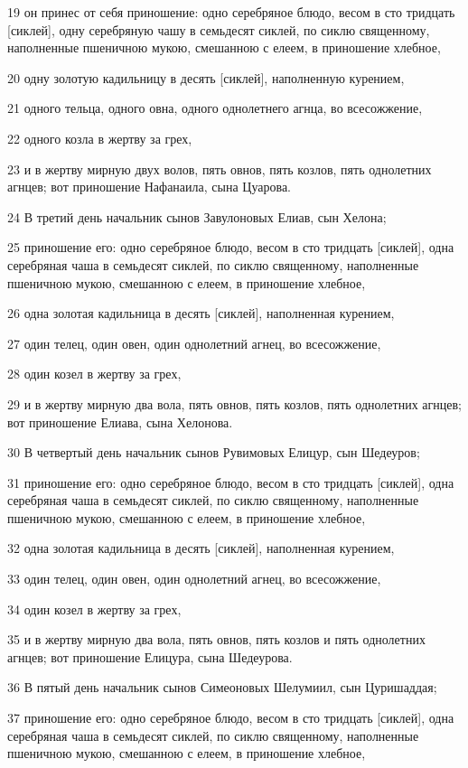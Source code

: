 \par 19 он принес от себя приношение: одно серебряное блюдо, весом в сто тридцать [сиклей], одну серебряную чашу в семьдесят сиклей, по сиклю священному, наполненные пшеничною мукою, смешанною с елеем, в приношение хлебное,
\par 20 одну золотую кадильницу в десять [сиклей], наполненную курением,
\par 21 одного тельца, одного овна, одного однолетнего агнца, во всесожжение,
\par 22 одного козла в жертву за грех,
\par 23 и в жертву мирную двух волов, пять овнов, пять козлов, пять однолетних агнцев; вот приношение Нафанаила, сына Цуарова.
\par 24 В третий день начальник сынов Завулоновых Елиав, сын Хелона;
\par 25 приношение его: одно серебряное блюдо, весом в сто тридцать [сиклей], одна серебряная чаша в семьдесят сиклей, по сиклю священному, наполненные пшеничною мукою, смешанною с елеем, в приношение хлебное,
\par 26 одна золотая кадильница в десять [сиклей], наполненная курением,
\par 27 один телец, один овен, один однолетний агнец, во всесожжение,
\par 28 один козел в жертву за грех,
\par 29 и в жертву мирную два вола, пять овнов, пять козлов, пять однолетних агнцев; вот приношение Елиава, сына Хелонова.
\par 30 В четвертый день начальник сынов Рувимовых Елицур, сын Шедеуров;
\par 31 приношение его: одно серебряное блюдо, весом в сто тридцать [сиклей], одна серебряная чаша в семьдесят сиклей, по сиклю священному, наполненные пшеничною мукою, смешанною с елеем, в приношение хлебное,
\par 32 одна золотая кадильница в десять [сиклей], наполненная курением,
\par 33 один телец, один овен, один однолетний агнец, во всесожжение,
\par 34 один козел в жертву за грех,
\par 35 и в жертву мирную два вола, пять овнов, пять козлов и пять однолетних агнцев; вот приношение Елицура, сына Шедеурова.
\par 36 В пятый день начальник сынов Симеоновых Шелумиил, сын Цуришаддая;
\par 37 приношение его: одно серебряное блюдо, весом в сто тридцать [сиклей], одна серебряная чаша в семьдесят сиклей, по сиклю священному, наполненные пшеничною мукою, смешанною с елеем, в приношение хлебное,
